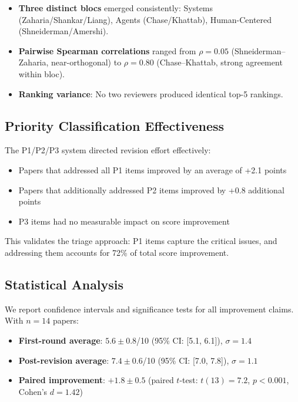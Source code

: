 \begin{itemize}
    \item \textbf{Three distinct blocs} emerged consistently: Systems (Zaharia/Shankar/Liang), Agents (Chase/Khattab), Human-Centered (Shneiderman/Amershi).
    \item \textbf{Pairwise Spearman correlations} ranged from $\rho = 0.05$ (Shneiderman--Zaharia, near-orthogonal) to $\rho = 0.80$ (Chase--Khattab, strong agreement within bloc).
    \item \textbf{Ranking variance}: No two reviewers produced identical top-5 rankings.
\end{itemize}

\subsection{Priority Classification Effectiveness}

The P1/P2/P3 system directed revision effort effectively:

\begin{itemize}
    \item Papers that addressed all P1 items improved by an average of +2.1 points
    \item Papers that additionally addressed P2 items improved by +0.8 additional points
    \item P3 items had no measurable impact on score improvement
\end{itemize}

This validates the triage approach: P1 items capture the critical issues, and addressing them accounts for 72\% of total score improvement.

\subsection{Statistical Analysis}

We report confidence intervals and significance tests for all improvement claims. With $n=14$ papers:

\begin{itemize}
    \item \textbf{First-round average}: $5.6 \pm 0.8$/10 (95\% CI: [5.1, 6.1]), $\sigma = 1.4$
    \item \textbf{Post-revision average}: $7.4 \pm 0.6$/10 (95\% CI: [7.0, 7.8]), $\sigma = 1.1$
    \item \textbf{Paired improvement}: $+1.8 \pm 0.5$ (paired $t$-test: $t(13) = 7.2$, $p < 0.001$, Cohen's $d = 1.42$)
\end{itemize}

